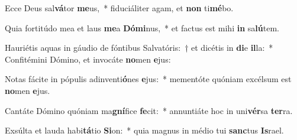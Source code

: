\item Ecce Deus sal\textbf{vá}tor \textbf{me}us,~* fiduciáliter agam, et \textbf{non} ti\textbf{mé}bo.
\item Quia fortitúdo mea et laus \textbf{me}a \textbf{Dó}\textbf{mi}nus,~* et factus est mihi \textbf{in} sa\textbf{lú}tem.
\item Hauriétis aquas in gáudio de fóntibus Salvatóris:~† et dicétis in \textbf{di}e \textbf{il}la:~* Confitémini Dómino, et invocáte \textbf{no}men \textbf{e}jus:
\item Notas fácite in pópulis adinventi\textbf{ó}nes \textbf{e}jus:~* mementóte quóniam excélsum est \textbf{no}men \textbf{e}jus.
\item Cantáte Dómino quóniam ma\textbf{gní}fice \textbf{fe}cit:~* annuntiáte hoc in uni\textbf{vér}sa \textbf{ter}ra.
\item Exsúlta et lauda habi\textbf{tá}tio \textbf{Si}on:~* quia magnus in médio tui \textbf{sanc}tus \textbf{Is}rael.
